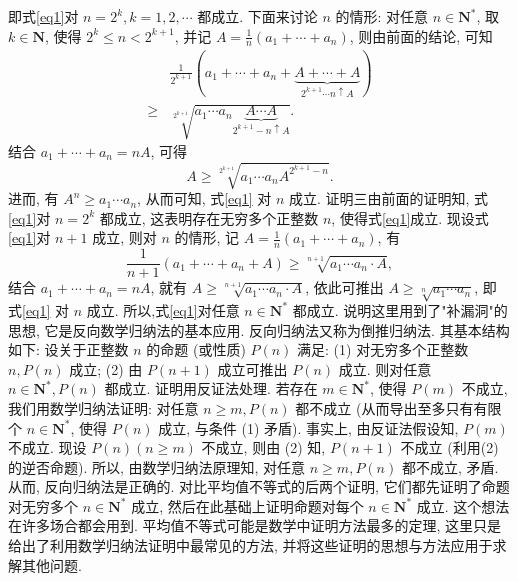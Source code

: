 即式\ref{eq1}对 $n=2^k, k=1,2, \cdots$ 都成立.
下面来讨论 $n$ 的情形: 对任意 $n \in \mathbf{N}^*$, 取 $k \in \mathbf{N}$, 使得 $2^k \leqslant n<2^{k+1}$, 并记 $A=\frac{1}{n}\left(a_1+\cdots+a_n\right)$, 则由前面的结论, 可知
$$
\begin{aligned}
& \frac{1}{2^{k+1}}(a_1+\cdots+a_n+\underbrace{A+\cdots+A}_{2^{k+1} \cdots n \uparrow A}) \\
\geqslant & \sqrt[2^{k+1}]{a_1 \cdots a_n \underbrace{A \cdots A}_{2^{k+1}-n \uparrow A}} .
\end{aligned}
$$
结合 $a_1+\cdots+a_n=n A$, 可得
$$
A \geqslant \sqrt[2^{k+1}]{a_1 \cdots a_n A^{2^{k+1}-n}} .
$$
进而, 有 $A^n \geqslant a_1 \cdots a_n$, 从而可知, 式\ref{eq1} 对 $n$ 成立.
证明三由前面的证明知, 式\ref{eq1}对 $n=2^k$ 都成立, 这表明存在无穷多个正整数 $n$, 使得式\ref{eq1}成立.
现设式\ref{eq1}对 $n+1$ 成立, 则对 $n$ 的情形, 记 $A=\frac{1}{n}\left(a_1+\cdots+a_n\right)$, 有
$$
\frac{1}{n+1}\left(a_1+\cdots+a_n+A\right) \geqslant \sqrt[n+1]{a_1 \cdots a_n \cdot A},
$$
结合 $a_1+\cdots+a_n=n A$, 就有 $A \geqslant \sqrt[n+1]{a_1 \cdots a_n \cdot A}$, 依此可推出 $A \geqslant \sqrt[n]{a_1 \cdots a_n}$,
即 式\ref{eq1} 对 $n$ 成立.
所以,式\ref{eq1}对任意 $n \in \mathbf{N}^*$ 都成立.
说明这里用到了"补漏洞"的思想, 它是反向数学归纳法的基本应用.
反向归纳法又称为倒推归纳法.
其基本结构如下:
设关于正整数 $n$ 的命题 (或性质) $P(n)$ 满足:
(1) 对无穷多个正整数 $n, P(n)$ 成立;
(2) 由 $P(n+1)$ 成立可推出 $P(n)$ 成立.
则对任意 $n \in \mathbf{N}^*, P(n)$ 都成立.
证明用反证法处理.
若存在 $m \in \mathbf{N}^*$, 使得 $P(m)$ 不成立, 我们用数学归纳法证明: 对任意 $n \geqslant m, P(n)$ 都不成立 (从而导出至多只有有限个 $n \in \mathbf{N}^*$, 使得 $P(n)$ 成立, 与条件 (1) 矛盾).
事实上, 由反证法假设知, $P(m)$ 不成立.
现设 $P(n)(n \geqslant m)$ 不成立, 则由 (2) 知, $P(n+1)$ 不成立 (利用(2) 的逆否命题).
所以, 由数学归纳法原理知, 对任意 $n \geqslant m, P(n)$ 都不成立, 矛盾.
从而, 反向归纳法是正确的.
对比平均值不等式的后两个证明, 它们都先证明了命题对无穷多个 $n \in \mathbf{N}^*$ 成立, 然后在此基础上证明命题对每个 $n \in \mathbf{N}^*$ 成立.
这个想法在许多场合都会用到.
平均值不等式可能是数学中证明方法最多的定理, 这里只是给出了利用数学归纳法证明中最常见的方法, 并将这些证明的思想与方法应用于求解其他问题.




